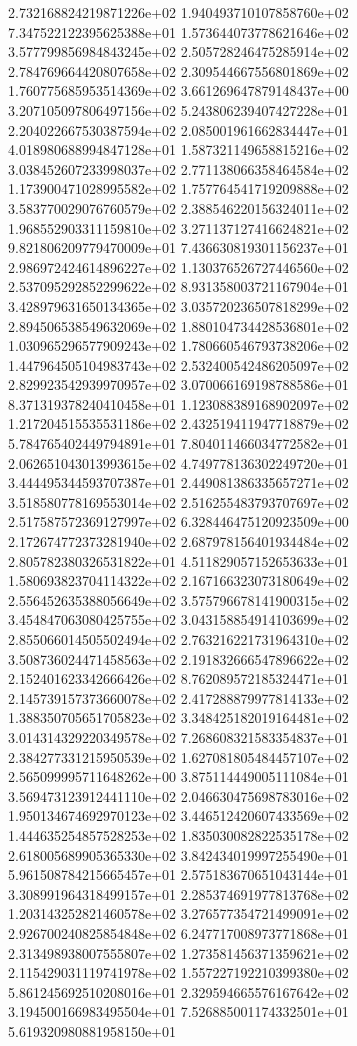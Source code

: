 2.732168824219871226e+02 1.940493710107858760e+02 7.347522122395625388e+01
1.573644073778621646e+02 3.577799856984843245e+02 2.505728246475285914e+02
2.784769664420807658e+02 2.309544667556801869e+02 1.760775685953514369e+02
3.661269647879148437e+00 3.207105097806497156e+02 5.243806239407427228e+01
2.204022667530387594e+02 2.085001961662834447e+01 4.018980688994847128e+01
1.587321149658815216e+02 3.038452607233998037e+02 2.771138066358464584e+02
1.173900471028995582e+02 1.757764541719209888e+02 3.583770029076760579e+02
2.388546220156324011e+02 1.968552903311159810e+02 3.271137127416624821e+02
9.821806209779470009e+01 7.436630819301156237e+01 2.986972424614896227e+02
1.130376526727446560e+02 2.537095292852299622e+02 8.931358003721167904e+01
3.428979631650134365e+02 3.035720236507818299e+02 2.894506538549632069e+02
1.880104734428536801e+02 1.030965296577909243e+02 1.780660546793738206e+02
1.447964505104983743e+02 2.532400542486205097e+02 2.829923542939970957e+02
3.070066169198788586e+01 8.371319378240410458e+01 1.123088389168902097e+02
1.217204515535531186e+02 2.432519411947718879e+02 5.784765402449794891e+01
7.804011466034772582e+01 2.062651043013993615e+02 4.749778136302249720e+01
3.444495344593707387e+01 2.449081386335657271e+02 3.518580778169553014e+02
2.516255483793707697e+02 2.517587572369127997e+02 6.328446475120923509e+00
2.172674772373281940e+02 2.687978156401934484e+02 2.805782380326531822e+01
4.511829057152653633e+01 1.580693823704114322e+02 2.167166323073180649e+02
2.556452635388056649e+02 3.575796678141900315e+02 3.454847063080425755e+02
3.043158854914103699e+02 2.855066014505502494e+02 2.763216221731964310e+02
3.508736024471458563e+02 2.191832666547896622e+02 2.152401623342666426e+02
8.762089572185324471e+01 2.145739157373660078e+02 2.417288879977814133e+02
1.388350705651705823e+02 3.348425182019164481e+02 3.014314329220349578e+02
7.268608321583354837e+01 2.384277331215950539e+02 1.627081805484457107e+02
2.565099995711648262e+00 3.875114449005111084e+01 3.569473123912441110e+02
2.046630475698783016e+02 1.950134674692970123e+02 3.446512420607433569e+02
1.444635254857528253e+02 1.835030082822535178e+02 2.618005689905365330e+02
3.842434019997255490e+01 5.961508784215665457e+01 2.575183670651043144e+01
3.308991964318499157e+01 2.285374691977813768e+02 1.203143252821460578e+02
3.276577354721499091e+02 2.926700240825854848e+02 6.247717008973771868e+01
2.313498938007555807e+02 1.273581456371359621e+02 2.115429031119741978e+02
1.557227192210399380e+02 5.861245692510208016e+01 2.329594665576167642e+02
3.194500166983495504e+01 7.526885001174332501e+01 5.619320980881958150e+01
